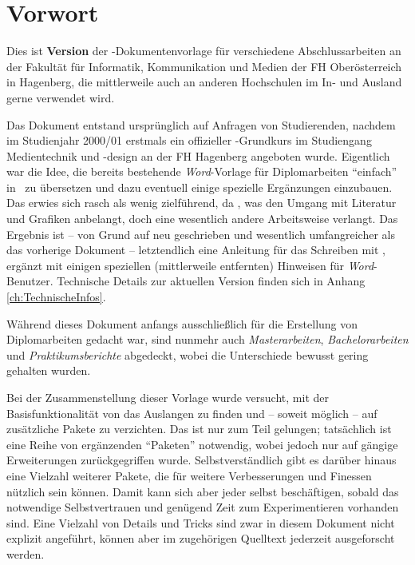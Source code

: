 \chapter{Vorwort} 	%



Dies ist \textbf{Version \hgbthesisDate} der \latex-Dokumentenvorlage für 
verschiedene Abschlussarbeiten an der Fakultät für Informatik, Kommunikation
und Medien der FH Oberösterreich in Hagenberg, die mittlerweile auch 
an anderen Hochschulen im In- und Ausland gerne verwendet wird.

Das Dokument entstand ursprünglich auf Anfragen von Studierenden,
nachdem im Studienjahr 2000/01 erstmals ein offizieller
\latex-Grundkurs im Studiengang Medientechnik und -design an der
FH Hagenberg angeboten wurde. Eigentlich war die Idee, die bereits
bestehende \emph{Word}-Vorlage für Diplomarbeiten "`einfach"' in
\latex\ zu übersetzen und dazu eventuell einige spezielle
Ergänzungen einzubauen. Das erwies sich rasch als wenig
zielführend, da \latex, \va was den Umgang mit Literatur und
Grafiken anbelangt, doch eine wesentlich andere Arbeitsweise
verlangt. Das Ergebnis ist -- von Grund auf neu geschrieben und
wesentlich umfangreicher als das vorherige Dokument --
letztendlich eine Anleitung für das Schreiben mit \latex, ergänzt
mit einigen speziellen (mittlerweile entfernten) Hinweisen für \emph{Word}-Benutzer.
Technische Details zur aktuellen Version finden sich in Anhang \ref{ch:TechnischeInfos}.

Während dieses Dokument anfangs ausschließlich für die Erstellung
von Diplomarbeiten gedacht war, sind nunmehr auch  
\emph{Masterarbeiten}, \emph{Bachelor\-arbeiten} und \emph{Praktikumsberichte} 
abgedeckt, wobei die Unterschiede bewusst gering gehalten wurden.

Bei der Zusammenstellung dieser Vorlage wurde versucht, mit der
Basisfunktionalität von \latex das Auslangen zu finden und -- soweit möglich --
auf zusätzliche Pakete zu verzichten. Das ist nur zum Teil gelungen;
tat\-säch\-lich ist eine Reihe von ergänzenden "`Paketen"' notwendig, wobei jedoch
nur auf gängige Erweiterungen zurückgegriffen wurde.
Selbstverständlich gibt es darüber hinaus eine Vielzahl weiterer Pakete,
die für weitere Verbesserungen und Finessen nützlich sein können. Damit kann
sich aber jeder selbst beschäftigen, sobald das notwendige Selbstvertrauen und
genügend Zeit zum Experimentieren vorhanden sind.
Eine Vielzahl von Details und Tricks sind zwar in diesem Dokument nicht explizit
angeführt, können aber im zugehörigen Quelltext jederzeit ausgeforscht
werden.

